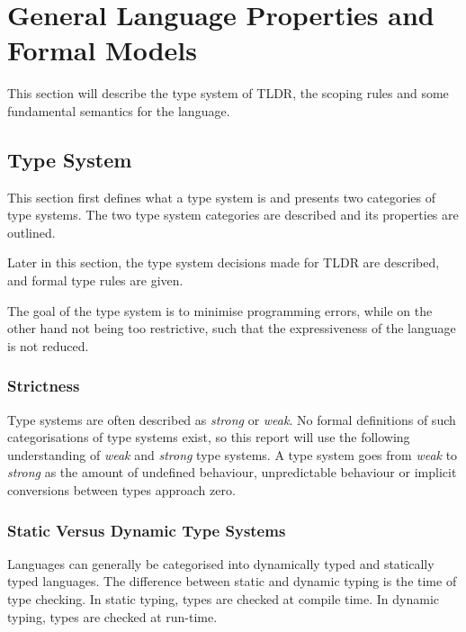 \section{General Language Properties and Formal Models}
This section will describe the type system of TLDR, the scoping rules and some fundamental semantics for the language.

\subsection{Type System}\label{typesys}

This section first defines what a type system is and presents two categories of type systems. The two type system categories are described and its properties are outlined.

Later in this section, the type system decisions made for TLDR are described, and formal type rules are given.


The goal of the type system is to minimise programming errors, while on the other hand not being too restrictive, such that the expressiveness of the language is not reduced. 

\subsubsection{Strictness}
Type systems are often described as \emph{strong} or \emph{weak}. No formal definitions of such categorisations of type systems exist, so this report will use the following understanding of \emph{weak} and \emph{strong} type systems. A type system goes from \emph{weak} to \emph{strong} as the amount of undefined behaviour, unpredictable behaviour or implicit conversions between types approach zero.

\subsubsection{Static Versus Dynamic Type Systems}
Languages can generally be categorised into dynamically typed and statically typed languages. The difference between static and dynamic typing is the time of type checking. In static typing, types are checked at compile time. In dynamic typing, types are checked at run-time.

